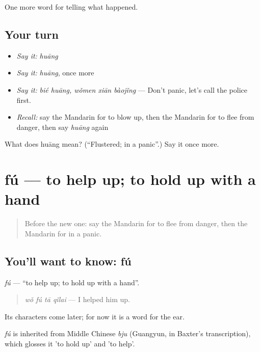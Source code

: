 \begin{grammarlens}[title={What you've built}]
One more word for telling what happened.
\end{grammarlens}

\subsection*{Your turn}
\begin{itemize}
\raggedright
  \item \emph{Say it:} \emph{huāng}
  \item \emph{Say it:} \emph{huāng}, once more
  \item \emph{Say it:} \emph{bié huāng, wǒmen xiān bàojǐng} — Don't panic, let's call the police first.
  \item \emph{Recall:} say the Mandarin for to blow up, then the Mandarin for to flee from danger, then say \emph{huāng} again
\end{itemize}

\begin{tcolorbox}[breakable,colback=teal!4,colframe=teal!35!black,title={Before you move on}]
What does huāng mean? (\textquotedblleft{}Flustered; in a panic\textquotedblright{}.) Say it once more.
\end{tcolorbox}
\section[fú]{fú — to help up; to hold up with a hand}

\label{lesson:ZH-C301-fu-help}



\begin{quote}
Before the new one: say the Mandarin for to flee from danger, then the Mandarin for in a panic.
\end{quote}

\subsection*{You'll want to know: fú}
\emph{fú} — \textquotedblleft{}to help up; to hold up with a hand\textquotedblright{}.

\begin{quote}
\emph{wǒ fú tā qǐlai} — I helped him up.
\end{quote}

Its characters come later; for now it is a word for the ear.

\begin{cousinweb}
\emph{fú} is inherited from Middle Chinese \emph{bju} (Guangyun, in Baxter's transcription), which glosses it 'to hold up' and 'to help'.
\end{cousinweb}

